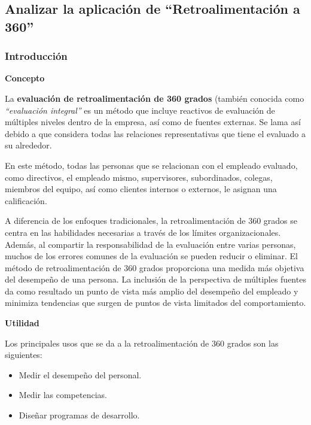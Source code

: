   

  
\newpage

\subsection{Analizar la aplicación de \textbf{``Retroalimentación a 360''} } %

\subsubsection{Introducción}


\textbf{Concepto}

La \textbf{evaluación de retroalimentación de 360 grados} (también conocida como \textit{``evaluación integral''} es un método que incluye reactivos de evaluación de múltiples niveles dentro de la empresa, así como de fuentes externas.
Se lama así debido a que considera todas las relaciones representativas que tiene el evaluado a su alrededor.

En este método, todas las personas que se relacionan con el empleado evaluado, como directivos, el empleado mismo, supervisores, subordinados, colegas, miembros del equipo, así como clientes internos o externos, le asignan una calificación.

A diferencia de los enfoques tradicionales, la retroalimentación de 360 grados se centra en las habilidades necesarias a través de los límites organizacionales.
Además, al compartir la responsabilidad de la evaluación entre varias personas, muchos de los errores comunes de la evaluación se pueden reducir o eliminar.
El método de retroalimentación de 360 grados proporciona una medida más objetiva del desempeño de una persona.
La inclusión de la perspectiva de múltiples fuentes da como resultado un punto de vista más amplio del desempeño del empleado y minimiza tendencias que surgen de puntos de vista limitados del comportamiento.


\textbf{Utilidad}

Los principales usos que se da a la retroalimentación de 360 grados son las siguientes:

\begin{itemize}
    \item Medir el desempeño del personal.
    \item Medir las competencias.
    \item Diseñar programas de desarrollo.
\end{itemize}

